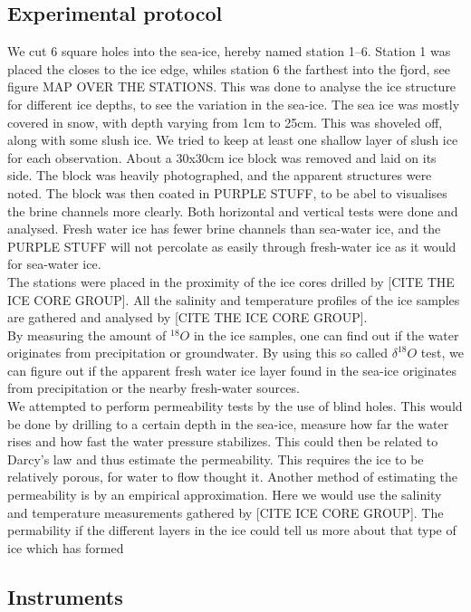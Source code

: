 \subsection{Experimental protocol}\label{subsec:experimental-protocol}
We cut 6 square holes into the sea-ice, hereby named station 1--6.
Station 1 was placed the closes to the ice edge, whiles station 6 the farthest into the fjord, see figure MAP OVER THE STATIONS.
This was done to analyse the ice structure for different ice depths, to see the variation in the sea-ice.
The sea ice was mostly covered in snow, with depth varying from 1cm to 25cm.
This was shoveled off, along with some slush ice.
We tried to keep at least one shallow layer of slush ice for each observation.
About a 30x30cm ice block was removed and laid on its side.
The block was heavily photographed, and the apparent structures were noted.
The block was then coated in PURPLE STUFF, to be abel to visualises the brine channels more clearly.
Both horizontal and vertical tests were done and analysed.
Fresh water ice has fewer brine channels than sea-water ice, and the PURPLE STUFF will not percolate as easily through fresh-water ice as it would for sea-water ice.\\
The stations were placed in the proximity of the ice cores drilled by [CITE THE ICE CORE GROUP].
All the salinity and temperature profiles of the ice samples are gathered and analysed by [CITE THE ICE CORE GROUP].\\
By measuring the amount of $^{18}O$ in the ice samples, one can find out if the water originates from precipitation or groundwater.
By using this so called $\delta ^{18}O$ test, we can figure out if the apparent fresh water ice layer found in the sea-ice originates from precipitation or the nearby fresh-water sources.\\
We attempted to perform permeability tests by the use of blind holes.
This would be done by drilling to a certain depth in the sea-ice, measure how far the water rises and how fast the water pressure stabilizes.
This could then be related to Darcy's law and thus estimate the permeability.
This requires the ice to be relatively porous, for water to flow thought it.
Another method of estimating the permeability is by an empirical approximation.
Here we would use the salinity and temperature measurements gathered by [CITE ICE CORE GROUP].
The permability if the different layers in the ice could tell us more about that type of ice which has formed

\subsection{Instruments}\label{subsec:instruments}





